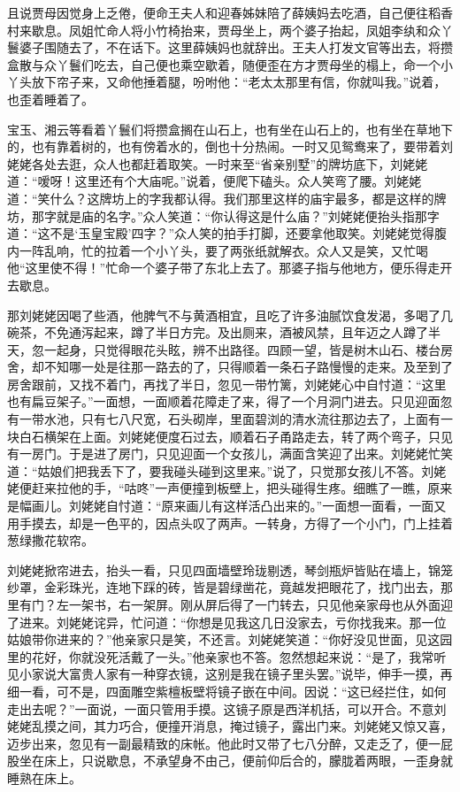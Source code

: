 \documentclass[12pt,oneside]{book}
\begin{document}
且说贾母因觉身上乏倦，便命王夫人和迎春姊妹陪了薛姨妈去吃酒，自己便往稻香村来歇息。凤姐忙命人将小竹椅抬来，贾母坐上，两个婆子抬起，凤姐李纨和众丫鬟婆子围随去了，不在话下。这里薛姨妈也就辞出。王夫人打发文官等出去，将攒盒散与众丫鬟们吃去，自己便也乘空歇着，随便歪在方才贾母坐的榻上，命一个小丫头放下帘子来，又命他捶着腿，吩咐他：“老太太那里有信，你就叫我。”说着，也歪着睡着了。

宝玉、湘云等看着丫鬟们将攒盒搁在山石上，也有坐在山石上的，也有坐在草地下的，也有靠着树的，也有傍着水的，倒也十分热闹。一时又见鸳鸯来了，要带着刘姥姥各处去逛，众人也都赶着取笑。一时来至“省亲别墅”的牌坊底下，刘姥姥道：“嗳呀！这里还有个大庙呢。”说着，便爬下磕头。众人笑弯了腰。刘姥姥道：“笑什么？这牌坊上的字我都认得。我们那里这样的庙宇最多，都是这样的牌坊，那字就是庙的名字。”众人笑道：“你认得这是什么庙？”刘姥姥便抬头指那字道：“这不是‘玉皇宝殿’四字？”众人笑的拍手打脚，还要拿他取笑。刘姥姥觉得腹内一阵乱响，忙的拉着一个小丫头，要了两张纸就解衣。众人又是笑，又忙喝他“这里使不得！”忙命一个婆子带了东北上去了。那婆子指与他地方，便乐得走开去歇息。

那刘姥姥因喝了些酒，他脾气不与黄酒相宜，且吃了许多油腻饮食发渴，多喝了几碗茶，不免通泻起来，蹲了半日方完。及出厕来，酒被风禁，且年迈之人蹲了半天，忽一起身，只觉得眼花头眩，辨不出路径。四顾一望，皆是树木山石、楼台房舍，却不知哪一处是往那一路去的了，只得顺着一条石子路慢慢的走来。及至到了房舍跟前，又找不着门，再找了半日，忽见一带竹篱，刘姥姥心中自忖道：“这里也有扁豆架子。”一面想，一面顺着花障走了来，得了一个月洞门进去。只见迎面忽有一带水池，只有七八尺宽，石头砌岸，里面碧浏的清水流往那边去了，上面有一块白石横架在上面。刘姥姥便度石过去，顺着石子甬路走去，转了两个弯子，只见有一房门。于是进了房门，只见迎面一个女孩儿，满面含笑迎了出来。刘姥姥忙笑道：“姑娘们把我丢下了，要我碰头碰到这里来。”说了，只觉那女孩儿不答。刘姥姥便赶来拉他的手，“咕咚”一声便撞到板壁上，把头碰得生疼。细瞧了一瞧，原来是幅画儿。刘姥姥自忖道：“原来画儿有这样活凸出来的。”一面想一面看，一面又用手摸去，却是一色平的，因点头叹了两声。一转身，方得了一个小门，门上挂着葱绿撒花软帘。

刘姥姥掀帘进去，抬头一看，只见四面墙壁玲珑剔透，琴剑瓶炉皆贴在墙上，锦笼纱罩，金彩珠光，连地下踩的砖，皆是碧绿凿花，竟越发把眼花了，找门出去，那里有门？左一架书，右一架屏。刚从屏后得了一门转去，只见他亲家母也从外面迎了进来。刘姥姥诧异，忙问道：“你想是见我这几日没家去，亏你找我来。那一位姑娘带你进来的？”他亲家只是笑，不还言。刘姥姥笑道：“你好没见世面，见这园里的花好，你就没死活戴了一头。”他亲家也不答。忽然想起来说：“是了，我常听见小家说大富贵人家有一种穿衣镜，这别是我在镜子里头罢。”说毕，伸手一摸，再细一看，可不是，四面雕空紫檀板壁将镜子嵌在中间。因说：“这已经拦住，如何走出去呢？”一面说，一面只管用手摸。这镜子原是西洋机括，可以开合。不意刘姥姥乱摸之间，其力巧合，便撞开消息，掩过镜子，露出门来。刘姥姥又惊又喜，迈步出来，忽见有一副最精致的床帐。他此时又带了七八分醉，又走乏了，便一屁股坐在床上，只说歇息，不承望身不由己，便前仰后合的，朦胧着两眼，一歪身就睡熟在床上。
\end{document}
